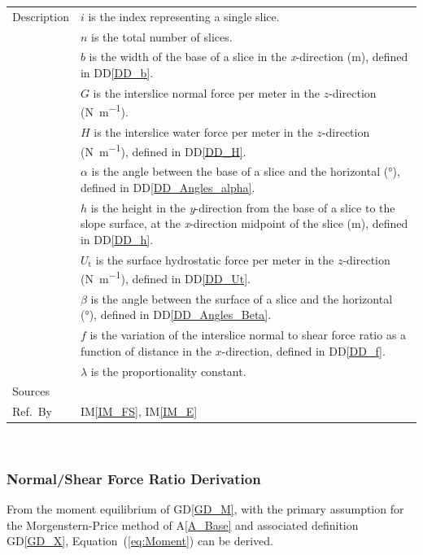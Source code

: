 \documentclass[12pt]{article}
\newcommand{\colAwidth}{0.13\textwidth}
\newcommand{\colBwidth}{0.82\textwidth}
\newcommand{\aref}[1]{A\ref{#1}}
\newcommand{\iref}[1]{IM\ref{#1}}
\newcommand{\ddref}[1]{DD\ref{#1}}
\newcommand{\dref}[1]{GD\ref{#1}}
\begin{document}
\begin{minipage}{\textwidth}
\begin{tabular}{| p{\colAwidth} | p{\colBwidth} |}
\hline Description & $i$ is the index representing a single slice.\\
&$n$ is the total number of slices.\\
&$b$ is the width of the base of a slice in the \textit{x}-direction 
(\si{\meter}), defined in \ddref{DD_b}.\\
&$G$ is the interslice normal force per meter in the $z$-direction 
(\si{\newton\per\meter}).\\
&$H$ is the interslice water force per meter in the $z$-direction 
(\si{\newton\per\meter}), defined in \ddref{DD_H}. \\
&$\alpha$ is the angle between the base of a slice and the 
horizontal (\si{\degree}), defined in \ddref{DD_Angles_alpha}. \\
&$h$ is the height in the \textit{y}-direction from the base of a slice 
to the slope surface, at the \textit{x}-direction midpoint of the slice 
(\si{\meter}), defined in \ddref{DD_h}.\\
&$U_\text{t}$ is the surface hydrostatic force per meter in the $z$-direction 
(\si{\newton\per\meter}), defined in \ddref{DD_Ut}.\\
&$\beta$ is the angle between the surface of a slice and the 
horizontal (\si{\degree}), defined in \ddref{DD_Angles_Beta}. \\
&$f$ is the variation of the interslice normal to shear force ratio as a 
function of distance in the $x$-direction, defined in \ddref{DD_f}. \\
&$\lambda$ is the proportionality constant.\\

\hline Sources& \cite{ZhuEtAl2005}\\

\hline Ref.\ By & \iref{IM_FS}, \iref{IM_E} \\

\hline
\end{tabular}
\end{minipage}\\


\subsubsection*{Normal/Shear Force Ratio Derivation}

 From the moment equilibrium of \dref{GD_M}, with the primary assumption for 
 the Morgenstern-Price method of \aref{A_Base} and associated definition 
 \dref{GD_X}, Equation~(\ref{eq:Moment}) can be derived.
\end{document}
